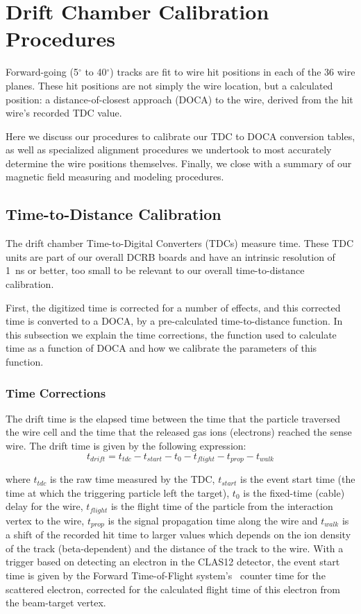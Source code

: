 \section{Drift Chamber Calibration Procedures}
\label{calibration}

Forward-going (5$^{\circ}$ to 40$^{\circ}$) tracks are fit to
wire hit positions in each of the 36 wire planes.  These
hit positions are not simply the wire location, but 
a calculated position: a distance-of-closest approach (DOCA)
to the wire, derived from the hit wire's recorded TDC value.  

Here we discuss our procedures to calibrate our TDC to DOCA conversion
tables, as well as specialized alignment procedures we undertook
to most accurately determine the wire positions themselves.
Finally, we close with a summary of our magnetic field measuring
and modeling procedures.

\subsection{Time-to-Distance Calibration}

The drift chamber Time-to-Digital Converters (TDCs) measure time.  
These TDC units are part of our overall DCRB boards and
have an intrinsic resolution of 1~ns or better, too small to be relevant to
our overall time-to-distance calibration.

First, the digitized time is corrected for a number of effects, and this corrected time is converted
to a DOCA, by a pre-calculated time-to-distance function.  In this subsection we 
explain the time corrections, the function used to calculate time as a 
function of DOCA and how we calibrate the parameters of this function.

\subsubsection{Time Corrections}

The drift time is the elapsed time between the time that the particle 
traversed the wire cell and the time that the released gas ions (electrons)
reached the sense wire.
The drift time is given by the following expression:
\begin{equation} 
\label{tdrift}
t_{drift} = t_{tdc} - t_{start} - t_{0} - t_{flight} - t_{prop} - t_{walk}
\end{equation}

\noindent
where $t_{tdc}$ is the raw time measured by the TDC, $t_{start}$ is the event start time (the time at which
the triggering particle left the target),  $t_0$ is the fixed-time (cable) delay for the wire, $t_{flight}$ is the 
flight time of the particle from the interaction vertex to the wire, $t_{prop}$ 
is the signal propagation time along the wire and $t_{walk}$ is a 
shift of the recorded hit time to larger values which depends on the
ion density of the track (beta-dependent) and the distance of the track to the wire. 
With a trigger based on detecting an electron in the CLAS12 detector, the event start time is 
given by the Forward Time-of-Flight system's~\cite{ftof-nim} counter time for the scattered
electron, corrected for the calculated flight time of this electron from the beam-target vertex.

